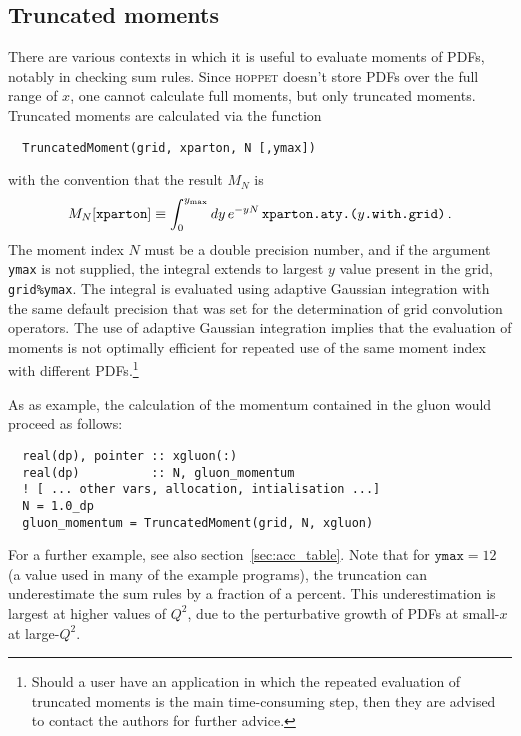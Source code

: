 \documentclass[12pt]{article}
\newcommand{\lc}{\left[}
\newcommand{\rc}{\right]}
\newcommand{\lp}{\left(}
\newcommand{\rp}{\right)}
\newcommand{\hoppet}{\textsc{hoppet}\xspace}
\newcommand{\ttt}[1]{\texttt{#1}}
\begin{document}
\subsection{Truncated moments}
\label{sec:sum-rules}

There are various contexts in which it is useful to evaluate moments
of PDFs, notably in checking sum rules. Since \hoppet doesn't store
PDFs over the full range of $x$, one cannot calculate full moments,
but only truncated moments.
%
%
Truncated moments are calculated via the function
\begin{lstlisting}
  TruncatedMoment(grid, xparton, N [,ymax])
\end{lstlisting}
with the convention that the result $M_N$ is 
\begin{equation}
  \label{eq:truncMom}
  M_N [\ttt{xparton}] \equiv \int_0^{y_{\rm max}} dy \,e^{-yN}\,
  \ttt{xparton.aty.(}y\ttt{.with.grid)}\,.
\end{equation}
The moment index $N$ must be a double precision number, and if the argument
\ttt{ymax} is not supplied, the integral extends to largest $y$ value
present in the grid, \ttt{grid\%ymax}. The integral is evaluated using
adaptive Gaussian integration with the same default precision that was
set for the determination of grid convolution operators. 
%
The use of adaptive Gaussian integration implies that the evaluation
of moments is not optimally efficient for repeated use of the same
moment index with different PDFs.\footnote{Should a user have an
  application in which the repeated evaluation of truncated moments is
  the main time-consuming step, then they are advised to contact the
  authors for further advice.}

As as example, the calculation of the momentum contained in the gluon
would proceed as follows:
\begin{lstlisting}
  real(dp), pointer :: xgluon(:)
  real(dp)          :: N, gluon_momentum
  ! [ ... other vars, allocation, intialisation ...]
  N = 1.0_dp
  gluon_momentum = TruncatedMoment(grid, N, xgluon)
\end{lstlisting}
For a further example, see also section~\ref{sec:acc_table}.
%
Note that for $\ttt{ymax}= 12$ (a value used in many of the example
programs), the truncation can underestimate the sum rules by a
fraction of a percent. This underestimation is largest
at higher values of $Q^2$, due to the perturbative growth of PDFs
at small-$x$ at large-$Q^2$.
\end{document}
